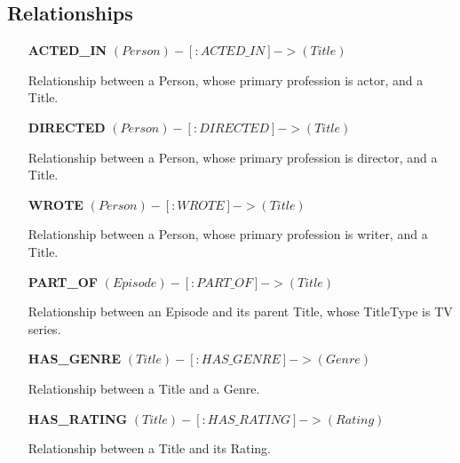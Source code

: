 \documentclass[a4paper,12pt]{article}
\begin{document}
\subsection{Relationships}
\begin{itemize}[noitemsep]
  
    \item[\textbf{ACTED\_IN}] $(Person)-[:ACTED\_IN]->(Title)$
    
    Relationship between a Person, whose primary profession is actor, and a Title.
    \item[\textbf{DIRECTED}] $(Person)-[:DIRECTED]->(Title)$
    
    Relationship between a Person, whose primary profession is director, and a Title.
    \item[\textbf{WROTE}] $(Person)-[:WROTE]->(Title)$
    
    Relationship between a Person, whose primary profession is writer, and a Title.
    \item[\textbf{PART\_OF}] $(Episode)-[:PART\_OF]->(Title)$
    
    Relationship between an Episode and its parent Title, whose TitleType is TV series.
    \item[\textbf{HAS\_GENRE}] $(Title)-[:HAS\_GENRE]->(Genre)$
    
    Relationship between a Title and a Genre.
    \item[\textbf{HAS\_RATING}] $(Title)-[:HAS\_RATING]->(Rating)$
    
    Relationship between a Title and its Rating.

    
\end{itemize}
\end{document}
